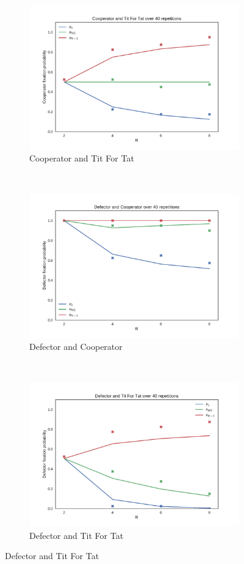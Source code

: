 \documentclass{article}
\begin{document}
\begin{figure}[!hbtp]
    \begin{subfigure}[t]{.3\textwidth}
        \centering
        \includegraphics[width=.8\textwidth]{../img/Cooperator_v_Tit_For_Tat.pdf}
        \caption{Cooperator and Tit For Tat}
    \end{subfigure}%
    ~
    \begin{subfigure}[t]{.3\textwidth}
        \centering
        \includegraphics[width=.8\textwidth]{../img/Defector_v_Cooperator.pdf}
        \caption{Defector and Cooperator}
    \end{subfigure}%
    ~
    \begin{subfigure}[t]{.3\textwidth}
        \centering
        \includegraphics[width=.8\textwidth]{../img/Defector_v_Tit_For_Tat.pdf}
        \caption{Defector and Tit For Tat}
    \end{subfigure}%


\end{figure}
\end{document}
